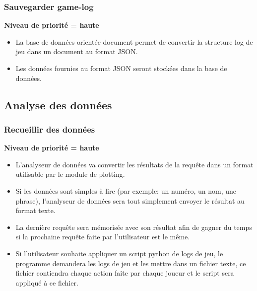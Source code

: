 \subsubsection{Sauvegarder game-log}

\textbf{Niveau de priorité = haute}\\
\begin{itemize}
\item La base de données orientée document permet de convertir la structure log de jeu dans un document au format JSON.
\item Les données fournies au format JSON seront stockées dans la base de données.
\end{itemize}
\subsection{Analyse des données}
\subsubsection{Recueillir des données}
\textbf{Niveau de priorité = haute}\\
\begin{itemize}

\item L'analyseur de données va convertir les résultats de la requête dans un format utilisable par le module de plotting.
\item Si les données sont simples à lire (par exemple: un numéro, un nom, une phrase), l'analyseur de données sera tout simplement envoyer le résultat au format texte.
\item La dernière requête sera mémorisée avec son résultat afin de gagner du temps si la prochaine requête faite par l'utilisateur est le même.
\item Si l'utilisateur souhaite appliquer un script python de logs de jeu, le programme demandera les logs de jeu et les mettre dans un fichier texte, ce fichier contiendra chaque action faite par chaque joueur et le script sera appliqué à ce fichier.
\end{itemize}


